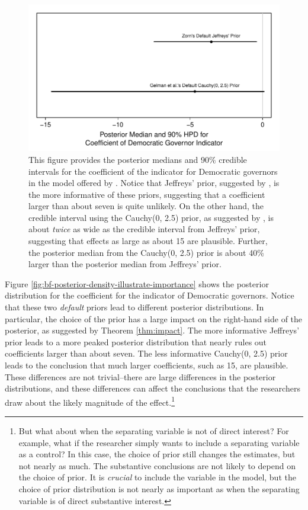 \documentclass[12pt]{article}
\begin{document}
\begin{figure}[H]
\begin{center}
\includegraphics[scale = .8]{figs/br-coef-illustrate-importance.pdf}
\caption{This figure provides the posterior medians and 90\% credible intervals for the coefficient of the indicator for Democratic governors in the model offered by \cite{BarrilleauxRainey2014}. 
Notice that Jeffreys' prior, suggested by \cite{Zorn2005}, is the more informative of these priors, suggesting that a coefficient larger than about seven is quite unlikely. 
On the other hand, the credible interval using the Cauchy(0, 2.5) prior, as suggested by \cite{Gelmanetal2008}, is about \emph{twice} as wide as the credible interval from Jeffreys' prior, suggesting that effects as large as about 15 are plausible. 
Further, the posterior median from the Cauchy(0, 2.5) prior is about 40\% larger than the posterior median from Jeffreys' prior.}\label{fig:br-coef-illustrate-importance}
\end{center}
\end{figure}

Figure \ref{fig:bf-posterior-density-illustrate-importance} shows the posterior distribution for the coefficient for the indicator of Democratic governors. 
Notice that these two \emph{default} priors lead to different posterior distributions. 
In particular, the choice of the prior has a large impact on the right-hand side of the posterior, as suggested by Theorem \ref{thm:impact}. 
The more informative Jeffreys' prior leads to a more peaked posterior distribution that nearly rules out coefficients larger than about seven. 
The less informative Cauchy(0, 2.5) prior leads to the conclusion that much larger coefficients, such as 15, are plausible. 
These differences are not trivial--there are large differences in the posterior distributions, and these differences can affect the conclusions that the researchers draw about the likely magnitude of the effect.\footnote{
But what about when the separating variable is not of direct interest? 
For example, what if the researcher simply wants to include a separating variable as a control? 
In this case, the choice of prior still changes the estimates, but not nearly as much. 
The substantive conclusions are not likely to depend on the choice of prior. 
It is \textit{crucial} \cite{Zorn2005} to include the variable in the model, but the choice of prior distribution is not nearly as important as when the separating variable is of direct substantive interest.}
\end{document}

